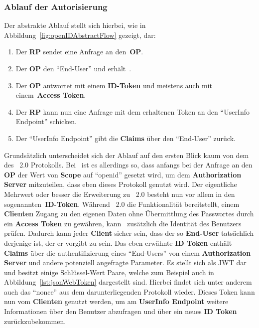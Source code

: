 	\subsubsection{Ablauf der Autorisierung}
		Der abstrakte Ablauf stellt sich hierbei, wie in Abbildung~\ref{fig:openIDAbstractFlow} gezeigt, dar:
		\begin{enumerate}[(1)]
			\item Der \textbf{RP}  sendet eine Anfrage an den~\textbf{OP}.
			\item Der \textbf{OP}  den \enquote{End-User}
			und erhält~.
			\item Der \textbf{OP} antwortet mit einem \textbf{ID-Token} und meistens auch mit einem~\textbf{Access Token}.
			\item Der \textbf{RP} kann nun eine Anfrage mit dem erhaltenen Token
			an den \enquote{UserInfo Endpoint} schicken.
			\item Der \enquote{UserInfo Endpoint} gibt die \textbf{Claims} über den \enquote{End-User} zurück.
		\end{enumerate}

		\bigskip\noindent
		Grundsätzlich unterscheidet sich der Ablauf auf den ersten Blick kaum
		von dem des~ 2.0 Protokolls.
		Bei~ ist es allerdings so,
		dass anfangs bei der Anfrage an den \textbf{OP}
		der Wert von \textbf{Scope} auf \enquote{openid} gesetzt wird,
		um dem \textbf{Authorization Server} mitzuteilen,
		dass eben dieses Protokoll genutzt wird.
		Der eigentliche Mehrwert oder besser die Erweiterung zu~ 2.0
		besteht nun vor allem in den sogenannten~\textbf{ID-Token}.
		Während~ 2.0 die Funktionalität bereitstellt,
		einem \textbf{Clienten} Zugang zu den eigenen Daten ohne Übermittlung des Passwortes
		durch ein \textbf{Access Token} zu gewähren,
		kann~ zusätzlich die Identität des Benutzers prüfen.
		Dadurch kann jeder \textbf{Client} sicher sein,
		dass der so  \textbf{End-User} tatsächlich derjenige ist,
		der er vorgibt zu sein.
		Das eben erwähnte \textbf{ID Token} enthält \textbf{Claims}
		über die \gls{authentifizierung} eines \enquote{End-Users}
		von einem \textbf{Authorization Server} und andere potenziell angefragte Parameter.
		Es stellt sich als JWT dar und besitzt einige Schlüssel-Wert Paare,
		welche zum Beispiel auch in Abbildung~\ref{lst:jsonWebToken} dargestellt sind.
		Hierbei findet sich unter anderem auch das \enquote{nonce} aus dem darunterliegenden Protokoll wieder.
		Dieses Token kann nun vom \textbf{Clienten} genutzt werden,
		um am \textbf{UserInfo Endpoint} weitere Informationen über den Benutzer abzufragen
		und über ein neues \textbf{ID Token} zurückzubekommen.